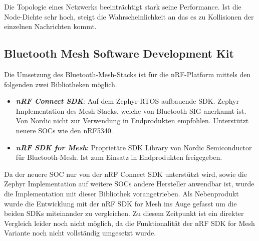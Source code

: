 Die Topologie eines Netzwerks beeinträchtigt stark seine Performance. Ist die Node-Dichte sehr hoch, steigt die Wahrscheinlichkeit an das es zu Kollisionen der einzelnen Nachrichten kommt. 


\subsection{Bluetooth Mesh Software Development Kit}\label{sec:BluetoothMeshSoftwareDevelopmentKit}

Die Umsetzung des Bluetooth-Mesh-Stacks ist für die nRF-Platform mittels den folgenden zwei Bibliotheken möglich. 

\begin{itemize}
	\item \textit{\textbf{nRF Connect SDK}}: Auf dem Zephyr-RTOS aufbauende SDK. Zephyr Implementation des Mesh-Stacks, welche von Bluetooth SIG anerkannt ist. Von Nordic nicht zur Verwendung in Endprodukten empfohlen. Unterstützt neuere SOCs wie den nRF5340.  \cite{nordic_semi_welcome_to_the_nrf_connect_sdk_2020}
	\item \textit{\textbf{nRF SDK for Mesh}}: Proprietäre SDK Library von Nordic Semiconductor für Bluetooth-Mesh. Ist zum Einsatz in Endprodukten freigegeben. \cite{nordic_semi_nrf_sdk_for_mesh_2020}
\end{itemize}

Da der neuere SOC nur von der nRF Connect SDK unterstützt wird, sowie die Zephyr Implementation auf weitere SOCs andere Hersteller anwendbar ist, wurde die Implementation mit dieser Bibliothek vorangetrieben. Als Nebenprodukt wurde die Entwicklung mit der nRF SDK for Mesh ins Auge gefasst um die beiden SDKs miteinander zu vergleichen. Zu diesem Zeitpunkt ist ein direkter Vergleich leider noch nicht möglich, da die Funktionalität der nRF SDK for Mesh Variante noch nicht vollständig umgesetzt wurde. 





